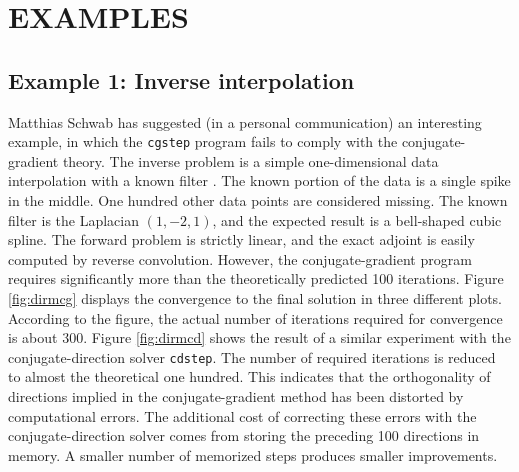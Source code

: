 \section{EXAMPLES}

\subsection{Example 1: Inverse interpolation}


Matthias Schwab has suggested (in a personal communication) an
interesting example, in which the \verb!cgstep! program fails to
comply with the conjugate-gradient theory. The inverse problem is a
simple one-dimensional data interpolation with a known filter
\cite{Claerbout.tdf.82}. The known portion of the data is a single
spike in the middle. One hundred other data points are considered
missing. The known filter is the Laplacian $(1,-2,1)$, and the
expected result is a bell-shaped cubic spline. The forward problem is
strictly linear, and the exact adjoint is easily computed by reverse
convolution. However, the conjugate-gradient program requires
significantly more than the theoretically predicted 100
iterations. Figure \ref{fig:dirmcg} displays the convergence to the
final solution in three different plots. According to the figure, the
actual number of iterations required for convergence is about
300. Figure \ref{fig:dirmcd} shows the result of a similar experiment
with the conjugate-direction solver \verb!cdstep!. The number of
required iterations is reduced to almost the theoretical one
hundred. This indicates that the orthogonality of directions implied
in the conjugate-gradient method has been distorted by computational
errors. The additional cost of correcting these errors with the
conjugate-direction solver comes from storing the preceding 100
directions in memory. A smaller number of memorized steps produces
smaller improvements.



